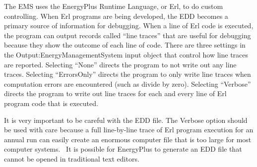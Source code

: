 The EMS uses the EnergyPlus Runtime Language, or Erl, to do custom controlling. When Erl programs are being developed, the EDD becomes a primary source of information for debugging. When a line of Erl code is executed, the program can output records called ``line traces'' that are useful for debugging because they show the outcome of each line of code. There are three settings in the Output:EnergyManagementSystem input object that control how line traces are reported. Selecting ``None'' directs the program to not write out any line traces. Selecting ``ErrorsOnly'' directs the program to only write line traces when computation errors are encountered (such as divide by zero). Selecting ``Verbose'' directs the program to write out line traces for each and every line of Erl program code that is executed.

It is very important to be careful with the EDD file. The Verbose option should be used with care because a full line-by-line trace of Erl program execution for an annual run can easily create an enormous computer file that is too large for most computer systems. ~It is possible for EnergyPlus to generate an EDD file that cannot be opened in traditional text editors.
